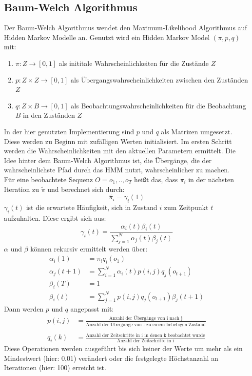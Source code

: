 \documentclass{article}
\begin{document}
\begin{align-*}
\section{Baum-Welch Algorithmus}
\label{sec:BaumWelch}
Der Baum-Welch Algorithmus wendet den Maximum-Likelihood Algorithmus auf Hidden Markov Modelle an.
Genutzt wird ein Hidden Markov Model $(\pi, p, q)$ mit:
\begin{enumerate}
\item $\pi: Z \rightarrow [0,1]$ als inititale Wahrscheinlichkeiten für die Zustände $Z$
\item $p: Z \times Z \rightarrow [0,1]$ als Übergangswahrscheinlichkeiten zwischen den Zuständen $Z$
\item $q: Z \times B \rightarrow [0,1]$ als Beobachtungswahrscheinlichkeiten für die Beobachtung $B$ in den Zuständen $Z$
\end{enumerate}
In der hier genutzten Implementierung sind $p$ und $q$ als Matrizen umgesetzt.
Diese werden zu Beginn mit zufälligen Werten initialisiert.
Im ersten Schritt werden die Wahrscheinlichkeiten mit den aktuellen Parametern ermittelt.
Die Idee hinter dem Baum-Welch Algorithmus ist, die Übergänge, die der wahrscheinlichste Pfad durch das HMM nutzt, wahrscheinlicher zu machen.\\
Für eine beobachtete Sequenz $O = {o_1, .., o_T}$ heißt das, dass $\pi_i$ in der nächsten Iteration zu $\tilde{\pi}$ und berechnet sich durch:
\[
\tilde{\pi_i} = \gamma_i(1)
\]
$\gamma_i(t)$ ist die erwartete Häufigkeit, sich in Zustand $i$ zum Zeitpunkt $t$ aufzuhalten.
Diese ergibt sich aus:
\[
\gamma_i(t) = \frac{\alpha_i(t)\beta_i(t)}{\sum_{j=1}^{N}\alpha_j(t)\beta_j(t)}
\]
$\alpha$ und $\beta$ können rekursiv ermittelt werden über:
\begin{align*}
\alpha_i(1) &= \pi_iq_i(o_1) \\
\alpha_j(t+1) &= \sum_{i=1}^{N}\alpha_i(t)p(i, j)q_j(o_{t+1})\\
\beta_i(T) &= 1 \\
\beta_i(t) &= \sum_{j=1}^{N}p(i, j)q_j(o_{t+1})\beta_j(t+1)
\end{align*}
Dann werden $p$ und $q$ angepasst mit:
\begin{align*}
p(i, j) &= \frac{\text{Anzahl der Übergänge von i nach j}}{\text{Anzahl der Übergänge von i zu einem beliebigen Zustand}}\\
\\
q_i(k) &= \frac{\text{Anzahl der Zeitschritte in i in denen k beobachtet wurde}}{\text{Anzahl der Zeitschritte in i}}
\end{align*}
Diese Operationen werden ausgeführt bis sich keiner der Werte um mehr als ein Mindestwert (hier: 0,01) verändert oder die festgelegte Höchstanzahl an Iterationen (hier: 100) erreicht ist.




\end{align-*}
\end{document}
